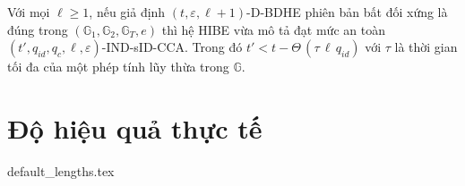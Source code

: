 \documentclass[class=report, crop=false]{standalone}
\begin{document}
		\begin{theorem}
			Với mọi $\ell \geq 1$, nếu giả định $(t, \varepsilon, \ell + 1)$-D-BDHE phiên bản bất đối xứng là đúng trong $(\mathbb{G}_1, \mathbb{G}_2, \mathbb{G}_T, e)$ thì hệ HIBE vừa mô tả đạt mức an toàn $(t', q_{id}, q_c, \ell, \varepsilon)$-IND-sID-CCA. Trong đó $t' < t - \Theta\,(\tau\, \ell\, q_{id})$ với $\tau$ là thời gian tối đa của một phép tính lũy thừa trong $\mathbb{G}$.
		\end{theorem}
	\section{Độ hiệu quả thực tế}
		
	

	\newpage
	{default_lengths.tex}
\end{document}

